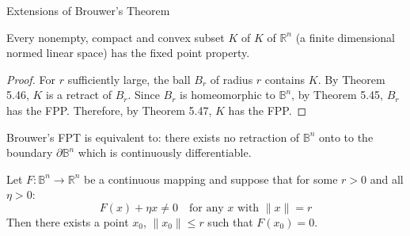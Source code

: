 \documentclass[aspectratio=169,10pt]{beamer}
\begin{document}
\begin{frame}[allowframebreaks]{Extensions of Brouwer's Theorem}
    \begin{theorem}[Theorem 5.49]
        Every nonempty, compact and convex subset $K$ of $K$ of $\mathbb{R}^n$ (a finite dimensional normed linear space) has the fixed point property.
    \end{theorem}

    \begin{proof}
        For $r$ sufficiently large, the ball $B_r$ of radius $r$ contains $K$. By Theorem 5.46, $K$ is a retract of $B_r$. Since $B_r$ is homeomorphic to $\mathbb{B}^n$, by Theorem 5.45, $B_r$ has the FPP. Therefore, by Theorem 5.47, $K$ has the FPP.
    \end{proof}

    \begin{theorem}[Theorem 5.50]
        Brouwer's FPT is equivalent to: there exists no retraction of $\mathbb{B}^n$ onto to the boundary $\partial\mathbb{B}^n$ which is continuously differentiable.
    \end{theorem}

    \begin{theorem}
        Let $F: \mathbb{B}^n \to \mathbb{R}^n$ be a continuous mapping and suppose that for some $r > 0$ and all $\eta > 0$:
        \[
        F(x) + \eta x \neq 0 \quad \text{for any } x \text{ with } \|x\| = r
        \]
        Then there exists a point $x_0$, $\|x_0\| \le r$ such that $F(x_0) = 0$.
    \end{theorem}
\end{frame}
\end{document}
